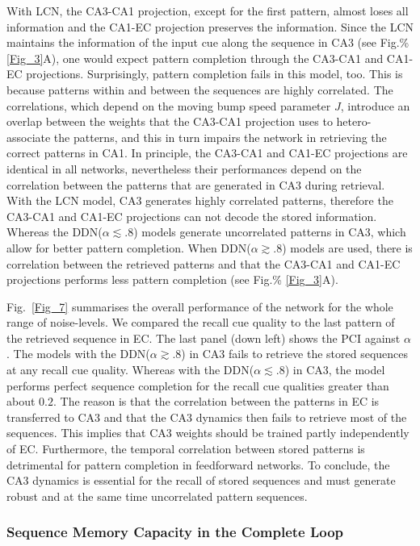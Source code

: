 \documentclass[utf8]{frontiersSCNS} %
\begin{document}
With LCN, the CA3-CA1 projection, except for the first pattern, almost loses all information and the CA1-EC projection preserves the information.
Since the LCN maintains the information of the input cue along the sequence in CA3 (see Fig.\% \ref{Fig_3}A), one would expect pattern completion through the CA3-CA1 and CA1-EC projections. Surprisingly, pattern completion fails in this model, too. This is because patterns within and between the sequences are highly correlated. The correlations, which depend on the moving bump speed parameter $J$, introduce an overlap between the weights that the CA3-CA1 projection uses to hetero-associate the patterns, and this in turn impairs the network in retrieving the correct patterns in CA1.
%
In principle, the CA3-CA1 and CA1-EC projections are identical in all networks, nevertheless their performances depend on the correlation between the patterns that are generated in CA3 during retrieval. With the LCN model, CA3 generates highly correlated patterns, therefore the CA3-CA1 and CA1-EC projections can not decode the stored information. Whereas the DDN($\alpha \lesssim .8$) models generate uncorrelated patterns in CA3, which allow for better pattern completion. When DDN($\alpha \gtrsim .8$) models are used, there is correlation between the retrieved patterns and that the CA3-CA1 and CA1-EC projections performs less pattern completion (see Fig.\% \ref{Fig_3}A).

%
Fig.~\ref{Fig_7} summarises the overall performance of the network for the whole range of noise-levels. We compared the recall cue quality to the last pattern of the retrieved sequence in EC.
%
The last panel (down left) shows the PCI against $\alpha$.
%
The models with the DDN($\alpha \gtrsim .8$) in CA3 fails to retrieve the stored sequences at any recall cue quality. Whereas with the DDN($\alpha \lesssim .8$) in CA3, the model performs perfect sequence completion for the recall cue qualities greater than about $0.2$.
%
The reason is that the correlation between the patterns in EC is transferred to CA3 and that the CA3 dynamics then fails to retrieve most of the sequences. This implies that CA3 weights should be trained partly independently of EC. Furthermore, the temporal correlation between stored patterns is detrimental for pattern completion in feedforward networks. 
To conclude, the CA3 dynamics is essential for the recall of stored sequences and must generate robust and at the same time uncorrelated pattern sequences.          

\subsubsection{Sequence Memory Capacity in the Complete Loop}
\end{document}
